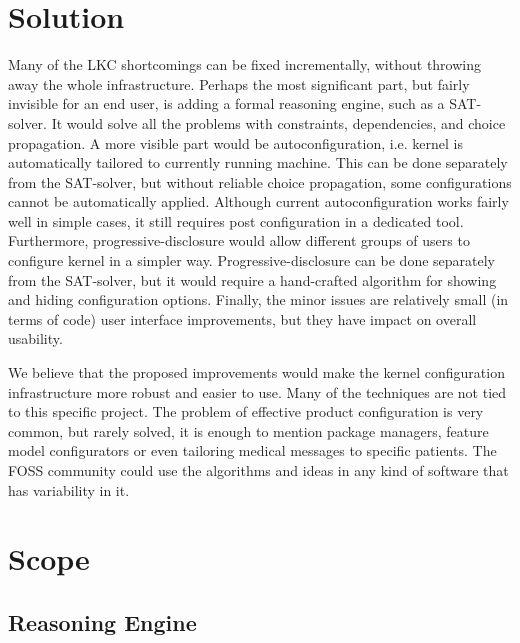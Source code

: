 \documentclass{chi2009}
\newcommand{\todo}[1]{\textsf{\textbf{\textcolor{Orange}{[[#1]]}}}}
\begin{document}
\section{Solution}
Many of the LKC shortcomings can be fixed incrementally, without throwing away the whole infrastructure. Perhaps the most significant part, but fairly invisible for an end user, is adding a formal reasoning engine, such as a SAT-solver. It would solve all the problems with constraints, dependencies, and choice propagation. A more visible part would be autoconfiguration, i.e. kernel is automatically tailored to currently running machine. This can be done separately from the SAT-solver, but without reliable choice propagation, some configurations cannot be automatically applied. Although current autoconfiguration works fairly well in simple cases, it still requires post configuration in a dedicated tool. Furthermore, progressive-disclosure would allow different groups of users to configure kernel in a simpler way. Progressive-disclosure can be done separately from the SAT-solver, but it would require a hand-crafted algorithm for showing and hiding configuration options. Finally, the minor issues are relatively small (in terms of code) user interface improvements, but they have impact on overall usability.

We believe that the proposed improvements would make the kernel configuration infrastructure more robust and easier to use. Many of the techniques are not tied to this specific project. The problem of effective product configuration is very common, but rarely solved, it is enough to mention package managers, feature model configurators or even tailoring medical messages to specific patients. The FOSS community could use the algorithms and ideas in any kind of software that has variability in it.


\section{Scope}

\subsection{Reasoning Engine}
\end{document}
